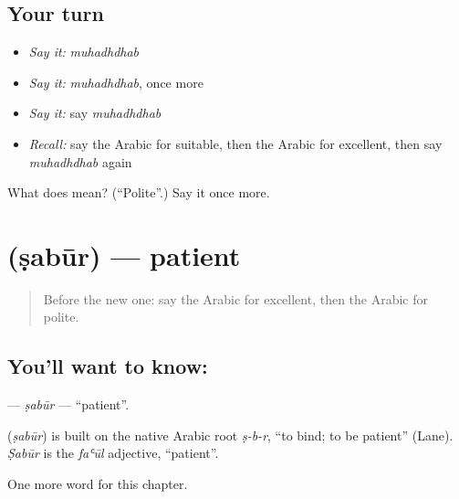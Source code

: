 \subsection*{Your turn}
\begin{itemize}
\raggedright
  \item \emph{Say it:} \emph{muhadhdhab}
  \item \emph{Say it:} \emph{muhadhdhab}, once more
  \item \emph{Say it:} say \emph{muhadhdhab}
  \item \emph{Recall:} say the Arabic for suitable, then the Arabic for excellent, then say \emph{muhadhdhab} again
\end{itemize}

\begin{tcolorbox}[breakable,colback=teal!4,colframe=teal!35!black,title={Before you move on}]
What does  mean? (\textquotedblleft{}Polite\textquotedblright{}.) Say it once more.
\end{tcolorbox}
\section[\texorpdfstring{\ar{صبور} (ṣabūr)}{صبور (ṣabūr)}]{ (ṣabūr) — patient}

\label{lesson:AR-C241-sabur}



\begin{quote}
Before the new one: say the Arabic for excellent, then the Arabic for polite.
\end{quote}

\subsection*{You'll want to know: }
\textbf{} — \emph{ṣabūr} — \textquotedblleft{}patient\textquotedblright{}.

\begin{cousinweb}
\textbf{} (\emph{ṣabūr}) is built on the native Arabic root \emph{ṣ-b-r}, \textquotedblleft{}to bind; to be patient\textquotedblright{} (Lane). \emph{Ṣabūr} is the \emph{faʿūl} adjective, \textquotedblleft{}patient\textquotedblright{}.
\end{cousinweb}

\begin{grammarlens}[title={What you've built}]
One more word for this chapter.
\end{grammarlens}

